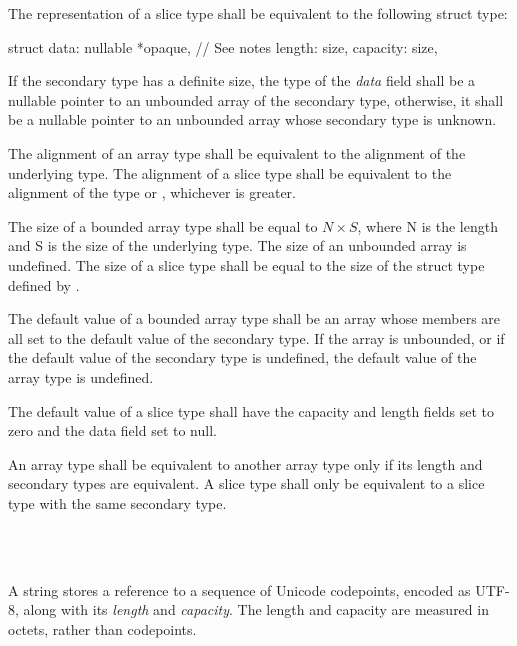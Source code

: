 \specsubsubitem
The representation of a slice type shall be equivalent to the following struct
type:

\begin{codesample}
struct {
	data: nullable *opaque, // See notes
	length: size,
	capacity: size,
}
\end{codesample}

If the secondary type has a definite size, the type of the \textit{data} field
shall be a nullable pointer to an unbounded array of the secondary type,
otherwise, it shall be a nullable pointer to an unbounded array whose secondary
type is unknown.

\specsubsubitem
The alignment of an array type shall be equivalent to the alignment of the
underlying type. The alignment of a slice type shall be equivalent to the
alignment of the  type or , whichever is
greater.

\specsubsubitem
The size of a bounded array type shall be equal to $N \times S$, where N is the
length and S is the size of the underlying type. The size of an unbounded array
is undefined. The size of a slice type shall be equal to the size of the struct
type defined by .

\specsubsubitem
The default value of a bounded array type shall be an array whose
members are all set to the default value of the secondary type. If the array is
unbounded, or if the default value of the secondary type is undefined, the
default value of the array type is undefined.

\specsubsubitem
The default value of a slice type shall have the capacity and length fields set
to zero and the data field set to null.

\specsubsubitem
An array type shall be equivalent to another array type only if its length and
secondary types are equivalent. A slice type shall only be equivalent to a
slice type with the same secondary type.


\begin{grammar}
 \\
	 \\
\end{grammar}

\specsubsubitem
A string stores a reference to a sequence of Unicode codepoints, encoded as
\hbox{UTF-8}, along with its \textit{length} and \textit{capacity}. The length
and capacity are measured in octets, rather than codepoints.


